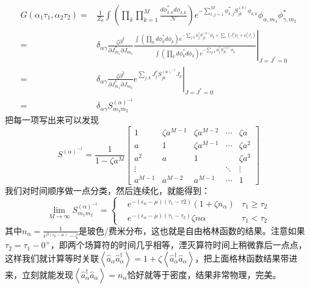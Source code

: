 \documentclass[12pt, a4paper, oneside]{ctexart}
\begin{document}
\begin{align} 
G(\alpha_1\tau_1,\alpha_2\tau_2)=  &\frac{1}{Z_{0}}\int \left(\prod_{\delta} \prod_{k = 1}^{M}  \frac{d \phi_{\delta,k}^{\ast} d\phi_{\delta, k}}{\mathcal{N}}\right) e^{-\sum_{i,j = 1}^{M} \phi_{\delta,j}^{\ast} S^{(\delta)}_{jk}\phi_{\delta,k}} \phi_{\alpha, m_1} \phi_{\gamma, m_2}^{\ast} \nonumber\\ 
=&\left.\delta_{\alpha\gamma} \frac{\zeta\partial^{2}}{\partial J_{m_1}^{\ast} \partial J_{m_2}} \frac{\int \left(\prod_{k} d \phi_{k}^{\ast} d\phi_{k}\right) e^{-\sum_{j,k}\phi_{j}^{\ast} S_{jk}^{(\alpha)}\phi_{k} + \sum_{i}(J^{\ast}_{i}\phi_{i} + \phi_{i}^{\ast}J_{i})}} {\int \left(\prod_{k} d \phi_{k}^{\ast} d\phi_{k}\right)e^{-\sum_{j,k}\phi_{j}^{\ast} S_{jk}^{(\alpha)}\phi_{k}} } \right|_{J=J^{\ast} = 0} \nonumber\\ 
=& \left.\delta_{\alpha\gamma} \frac{\zeta\partial^{2}}{\partial J_{m_1}^{\ast} \partial J_{m_2}} e^{\sum_{j,k}J^{\ast}_{j}S^{(\alpha) ^{-1}}_{jk}J_{k}}\right|_{J=J^{\ast} = 0} \nonumber\\
 =& \delta_{\alpha\gamma}S^{(\alpha) ^{-1}}_{m_1m_2} 
\end{align}
把每一项写出来可以发现
\begin{equation}
    S^{(\alpha)^{-1}} = \frac{1}{1 - \zeta a^{M}} \begin{bmatrix} 1                 & \zeta a^{M - 1} & \zeta a^{M - 2} & \cdots  & \zeta a \\ a                 & 1                            & \zeta a^{M - 1} &  \cdots & \zeta a^{2} \\ a^2            & a                            & 1                            &                & \zeta a^{3} \\ \vdots      &                                &                               & \ddots  &  \vdots \\ a^{M - 1} & a^{M - 2}              & a^{M - 1}            & \cdots  & 1 \end{bmatrix}
\end{equation}
我们对时间顺序做一点分类，然后连续化，就能得到：
\begin{equation}
\lim_{M \rightarrow \infty}S^{(\alpha)^{-1}}_{m_1m_2}  = \left\{\begin{aligned} &e^{-(\epsilon_{\alpha} - \mu) (\tau_{1} - \tau{2})} \left(1 + \zeta n_{\alpha} \right) &\tau_{1} \ge \tau_{2}\\ &e^{-(\epsilon_{\alpha} - \mu)(\tau_{1} - \tau_{2})} \zeta n{\alpha}  & \tau_{1} <  \tau_{2} \end{aligned} \right.
\end{equation}
其中$n_\alpha=\frac{1}{e^{\beta(\varepsilon_k-\mu)}-\zeta}$是玻色/费米分布，这也就是自由格林函数的结果。注意如果$\tau_2=\tau_1-0^+$，即两个场算符的时间几乎相等，湮灭算符时间上稍微靠后一点点，这样我们就计算等时关联$\left< \hat a_\alpha \hat a_\alpha^\dagger \right>=1+\zeta\left<  \hat a_\alpha^\dagger\hat a_\alpha \right>$，把上面格林函数结果带进来，立刻就能发现$\left<  \hat a_\alpha^\dagger\hat a_\alpha \right>=n_\alpha$恰好就等于密度，结果非常物理，完美。
\end{document}
